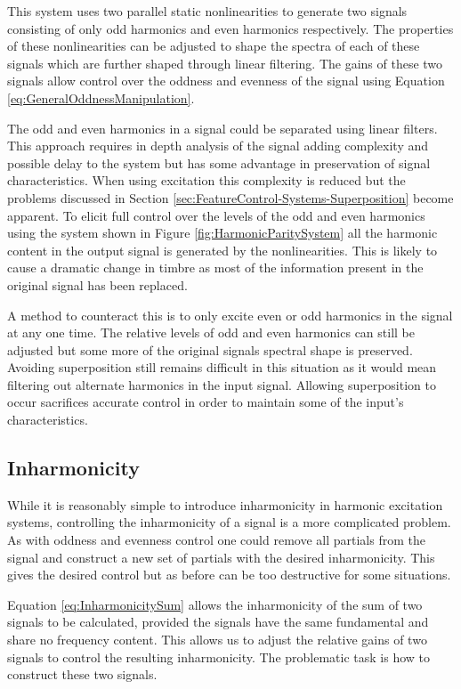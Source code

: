 		This system uses two parallel static nonlinearities to generate two signals consisting of only odd
		harmonics and even harmonics respectively. The properties of these nonlinearities can be adjusted to shape
		the spectra of each of these signals which are further shaped through linear filtering. The gains of these
		two signals allow control over the oddness and evenness of the signal using Equation
		\ref{eq:GeneralOddnessManipulation}.

		The odd and even harmonics in a signal could be separated using linear filters. This approach requires in
		depth analysis of the signal adding complexity and possible delay to the system but has some advantage in
		preservation of signal characteristics. When using excitation this complexity is reduced but the problems
		discussed in Section \ref{sec:FeatureControl-Systems-Superposition} become apparent. To elicit full control
		over the levels of the odd and even harmonics using the system shown in Figure
		\ref{fig:HarmonicParitySystem} all the harmonic content in the output signal is generated by the
		nonlinearities. This is likely to cause a dramatic change in timbre as most of the information present in
		the original signal has been replaced. 

		A method to counteract this is to only excite even or odd harmonics in the signal at any one time. The
		relative levels of odd and even harmonics can still be adjusted but some more of the original signals
		spectral shape is preserved. Avoiding superposition still remains difficult in this situation as it would
		mean filtering out alternate harmonics in the input signal. Allowing superposition to occur sacrifices
		accurate control in order to maintain some of the input's characteristics.

	\subsection{Inharmonicity}
	\label{sec:FeatureControl-Control-Inharmonicity}
		While it is reasonably simple to introduce inharmonicity in harmonic excitation systems, controlling the
		inharmonicity of a signal is a more complicated problem. As with oddness and evenness control one could
		remove all partials from the signal and construct a new set of partials with the desired inharmonicity.
		This gives the desired control but as before can be too destructive for some situations.
		
		Equation \ref{eq:InharmonicitySum} allows the inharmonicity of the sum of two signals to be calculated,
		provided the signals have the same fundamental and share no frequency content. This allows us to adjust the
		relative gains of two signals to control the resulting inharmonicity. The problematic task is how to
		construct these two signals.

